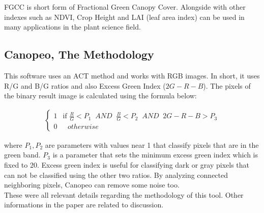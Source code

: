 \documentclass{article}
\begin{document}
FGCC is short form of Fractional Green Canopy Cover. Alongside with other indexes such as NDVI, Crop Height and LAI (leaf area index) can be used in many applications in the plant science field. 

\subsection{Canopeo, The Methodology}

This software uses an ACT method and works with RGB images. In short, it uses R/G and B/G ratios and also Excess Green Index ($2G - R - B$). The pixels of the binary result image is calculated using the formula below:

\begin{eqnarray}
\left\{
	\begin{array}{ll}
		1  & \mbox{if } \frac{R}{G} < P_1 \;\;AND\;\; \frac{B}{G} < P_2 \;\;AND\;\; 2G - R - B > P_3 \\
		0 & \mbox{ } otherwise
	\end{array}
\right.
\end{eqnarray}

where $P_1, P_2$ are parameters with values near 1 that classify pixels that are in the green band. $P_3$ is a parameter that sets the minimum excess green index which is fixed to 20. Excess green index is useful for classifying dark or gray pixels that can not be classified using the other two ratios. By analyzing connected neighboring pixels, Canopeo can remove some noise too. \\

These were all relevant details regarding the methodology of this tool. Other informations in the paper are related to discussion. 




	
\end{document}
